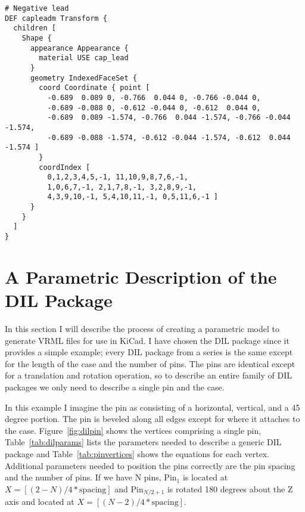 \documentclass[a4paper]{article}
\begin{document}
\begin{verbatim}
# Negative lead
DEF capleadm Transform {
  children [
    Shape {
      appearance Appearance {
        material USE cap_lead
      }
      geometry IndexedFaceSet {
        coord Coordinate { point [
          -0.689  0.089 0, -0.766  0.044 0, -0.766 -0.044 0,
          -0.689 -0.088 0, -0.612 -0.044 0, -0.612  0.044 0,
          -0.689  0.089 -1.574, -0.766  0.044 -1.574, -0.766 -0.044 -1.574,
          -0.689 -0.088 -1.574, -0.612 -0.044 -1.574, -0.612  0.044 -1.574 ]
        }
        coordIndex [
          0,1,2,3,4,5,-1, 11,10,9,8,7,6,-1,
          1,0,6,7,-1, 2,1,7,8,-1, 3,2,8,9,-1,
          4,3,9,10,-1, 5,4,10,11,-1, 0,5,11,6,-1 ]
      }
    }
  ]
}
\end{verbatim}


\section{A Parametric Description of the DIL Package}
In this section I will describe the process of creating a parametric model to generate
VRML files for use in KiCad.  I have chosen the DIL package since it provides a simple
example; every DIL package from a series is the same except for the length of the case
and the number of pins. The pins are identical except for a translation and rotation
operation, so to describe an entire family of DIL packages we only need to describe a
single pin and the case.

 In this example I imagine the pin as consisting of a horizontal, vertical, and a 45 degree
 portion. The pin is beveled along all edges except for where it attaches to the case.
 Figure~\ref{fig:dilpin} shows the vertices comprising a single pin, Table~\ref{tab:dilparams}
 lists the parameters needed to describe a generic DIL package and Table~\ref{tab:pinvertices}
 shows the equations for each vertex. Additional parameters needed to position the pins
 correctly are the pin spacing and the number of pins. If we have N pins, $\mathrm{Pin}_1$
 is located at $X = [(2-N)/4*\mathrm{spacing}]$ and $\mathrm{Pin}_{N/2+1}$ is rotated 180 degrees
 about the Z axis and located at $X = [(N-2)/4*\mathrm{spacing}]$.
\end{document}
